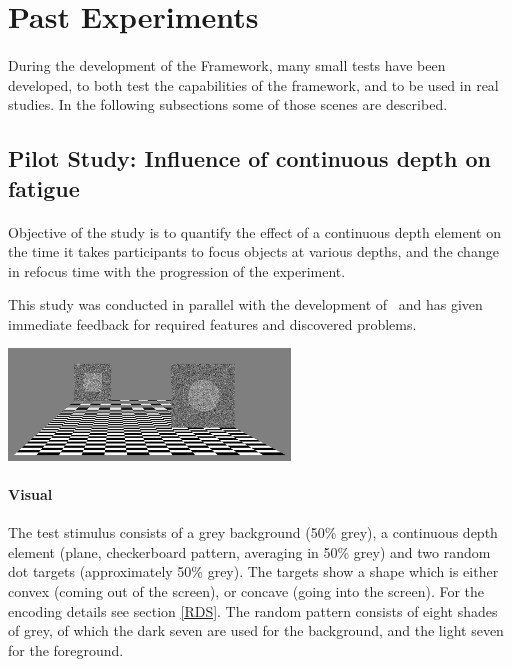 \section{Past Experiments}
\paragraph{}
During the development of the Framework, many small tests have been developed, to both test the capabilities of the framework, and to be used in real studies.
In the following subsections some of those scenes are described.

\subsection[Influence of continuous depth]{Pilot Study: Influence of continuous depth on fatigue\label{FatiguePilot}}
\paragraph{}
Objective of the study is to quantify the effect of a continuous depth element on the time it takes participants to focus objects at various depths, and the change in refocus time with the progression of the experiment.

This study was conducted in parallel with the development of \ER\ and has given immediate feedback for required features and discovered problems.


\begin{center}
\includegraphics[width=7.5cm]{media/pilotFatigue.png}
\end{center}

\paragraph{Visual}
The test stimulus consists of a grey background (50\% grey), a continuous depth element (plane, checkerboard pattern, averaging in 50\% grey) and two random dot targets (approximately 50\% grey).
The targets show a shape which is either convex (coming out of the screen), or concave (going into the screen).
For the encoding details see section \ref{RDS}. The random pattern consists of eight shades of grey, of which the dark seven are used for the background, and the light seven for the foreground.

